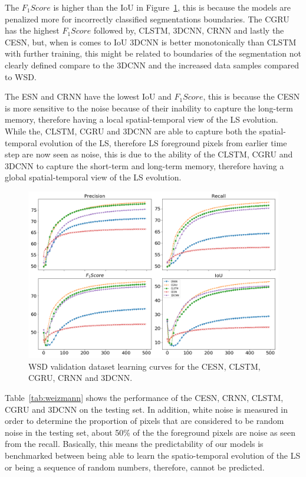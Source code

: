\documentclass{WitsPhysicsReport}
\begin{document}
The $F_{1}Score$ is higher than the IoU in Figure~\ref{fig:WEIZMANN_model_perfomance}, this is because the models are penalized more for incorrectly classified segmentations boundaries. The CGRU has the highest $F_{1}Score$ followed by, CLSTM, 3DCNN, CRNN and lastly the CESN, but, when is comes to IoU 3DCNN is better monotonically than CLSTM with further training, this might be related to boundaries of the segmentation not clearly defined compare to the 3DCNN and the increased data samples compared to WSD.

The ESN and CRNN have the lowest IoU and $F_{1}Score$, this is because the CESN is more sensitive to the noise because of their inability to capture the long-term memory, therefore having a local spatial-temporal view of the LS evolution. While the, CLSTM, CGRU and 3DCNN are able to capture both the spatial-temporal evolution of the LS, therefore LS foreground pixels from earlier time step are now seen as noise, this is due to the ability of the CLSTM, CGRU and 3DCNN to capture the short-term and long-term memory, therefore having a global spatial-temporal view of the LS evolution.


\begin{figure}[H]
\centering
  \includegraphics[width=1\textwidth]{Figure/Results/WEIZMANN_performance.png}
 \caption{WSD validation dataset learning curves for the CESN, CLSTM, CGRU, CRNN and 3DCNN.}
 \label{fig:WEIZMANN_model_perfomance}
\end{figure}

Table~\ref{tab:weizmann} shows the performance of the CESN, CRNN, CLSTM, CGRU and 3DCNN on the testing set. In addition, white noise is measured in order to determine the proportion of pixels that are considered to be random noise in the testing set, about 50\% of the the foreground pixels are noise as seen from the recall. Basically, this means the predictability of our models is benchmarked between being able to learn the spatio-temporal evolution of the LS or being a sequence of random numbers, therefore, cannot be predicted.  
\end{document}
